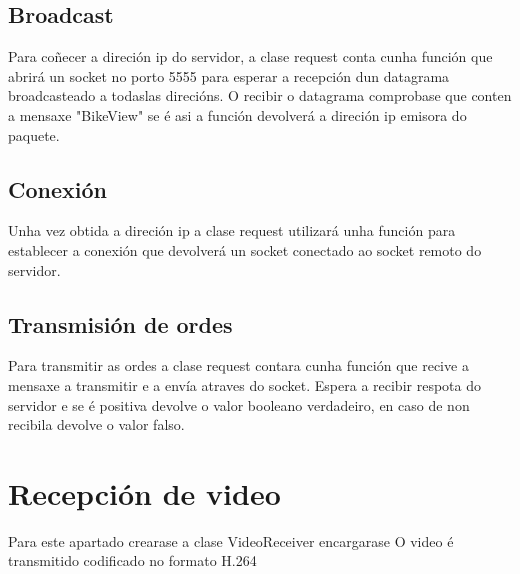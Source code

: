 \subsection{Broadcast}
Para coñecer a direción ip do servidor, a clase request conta cunha función que abrirá un socket no porto 5555 para esperar a recepción dun datagrama broadcasteado a todaslas direcións. O recibir o datagrama comprobase que conten a mensaxe "BikeView" se é asi a función devolverá a direción ip emisora do paquete.

\subsection{Conexión}
Unha vez obtida a direción ip a clase request utilizará unha función para establecer a conexión que devolverá un socket conectado ao socket remoto do servidor.

\subsection{Transmisión de ordes}
Para transmitir as ordes a clase request contara cunha función que recive a mensaxe a transmitir e a envía atraves do socket. Espera a recibir respota do servidor e se é positiva devolve o valor booleano verdadeiro, en caso de non recibila devolve o valor falso.

\section{Recepción de video}
Para este apartado crearase a clase VideoReceiver encargarase
O video é transmitido codificado no formato H.264

